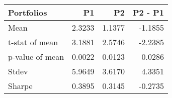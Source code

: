 \begin{tabular}{lrrr}
\toprule
Portfolios & P1 & P2 & P2 - P1 \\
\midrule
Mean & 2.3233 & 1.1377 & -1.1855 \\
t-stat of mean & 3.1881 & 2.5746 & -2.2385 \\
p-value of mean & 0.0022 & 0.0123 & 0.0286 \\
Stdev & 5.9649 & 3.6170 & 4.3351 \\
Sharpe & 0.3895 & 0.3145 & -0.2735 \\
\bottomrule
\end{tabular}
